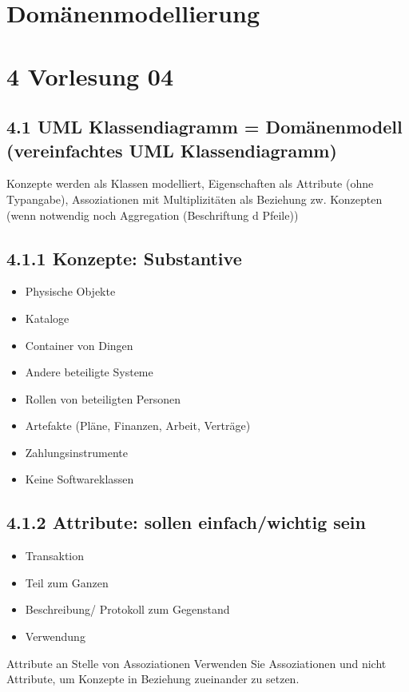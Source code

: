 \section{Domänenmodellierung}

\section*{4 Vorlesung 04}
\subsection*{4.1 UML Klassendiagramm = Domänenmodell (vereinfachtes UML Klassendiagramm)}
Konzepte werden als Klassen modelliert, Eigenschaften als Attribute (ohne Typangabe), Assoziationen mit Multiplizitäten als Beziehung zw. Konzepten (wenn notwendig noch Aggregation (Beschriftung d Pfeile))

\subsection*{4.1.1 Konzepte: Substantive}
\begin{itemize}
  \item Physische Objekte
  \item Kataloge
  \item Container von Dingen
  \item Andere beteiligte Systeme
  \item Rollen von beteiligten Personen
  \item Artefakte (Pläne, Finanzen, Arbeit, Verträge)
  \item Zahlungsinstrumente
  \item Keine Softwareklassen
\end{itemize}

\subsection*{4.1.2 Attribute: sollen einfach/wichtig sein}
\begin{itemize}
  \item Transaktion
  \item Teil zum Ganzen
  \item Beschreibung/ Protokoll zum Gegenstand
  \item Verwendung
\end{itemize}

Attribute an Stelle von Assoziationen Verwenden Sie Assoziationen und nicht Attribute, um Konzepte in Beziehung zueinander zu setzen.

